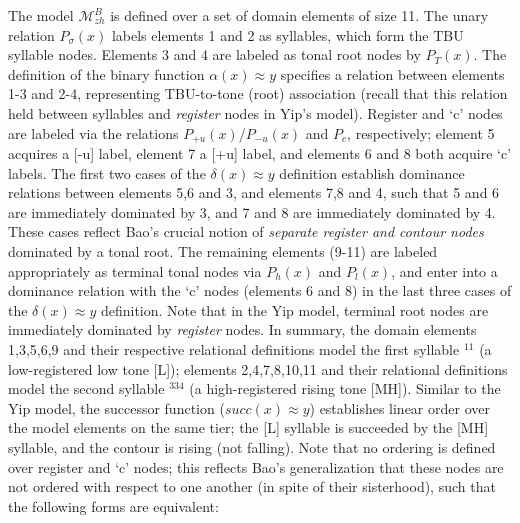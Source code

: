 \documentclass{article}
\newcommand{\ap}{\approx}
\begin{document}
The model $\mathcal{M}^{B}_{zh}$ is defined over a set of domain elements of size 11. The unary relation $P_{\sigma}(x)$ labels elements 1 and 2 as syllables, which form the TBU syllable nodes. Elements 3 and 4 are labeled as tonal root nodes by $P_{T}(x)$. The definition of the binary function $\alpha(x)\ap y$ specifies a relation between elements 1-3 and 2-4, representing TBU-to-tone (root) association (recall that this relation held between syllables and \emph{register} nodes in Yip's model). Register and `c' nodes are labeled via the relations $P_{+u}(x)$/$P_{-u}(x)$ and $P_{c}$, respectively; element 5 acquires a [-u] label, element 7 a [+u] label, and elements 6 and 8 both acquire `c' labels. The first two cases of the $\delta(x)\ap y$ definition establish dominance relations between elements 5,6 and 3, and elements 7,8 and 4, such that 5 and 6 are immediately dominated by 3, and 7 and 8 are immediately dominated by 4. These cases reflect Bao's crucial notion of \emph{separate register and contour nodes} dominated by a tonal root. The remaining elements (9-11) are labeled appropriately as terminal tonal nodes via $P_{h}(x)$ and $P_{l}(x)$, and enter into a dominance relation with the `c' nodes (elements 6 and 8) in the last three cases of the $\delta(x)\ap y$ definition. Note that in the Yip model, terminal root nodes are immediately dominated by \emph{register} nodes. In summary, the domain elements 1,3,5,6,9 and their respective relational definitions model the first syllable $^{11}$ (a low-registered low tone [L]); elements 2,4,7,8,10,11 and their relational definitions model the second syllable $^{334}$ (a high-registered rising tone [MH]). Similar to the Yip model, the successor function ($succ(x)\ap y$) establishes linear order over the model elements on the same tier; the [L] syllable is succeeded by the [MH] syllable, and the contour is rising (not falling). Note that no ordering is defined over register and `c' nodes; this reflects Bao's generalization that these nodes are not ordered with respect to one another (in spite of their sisterhood), such that the following forms are equivalent:
\end{document}
